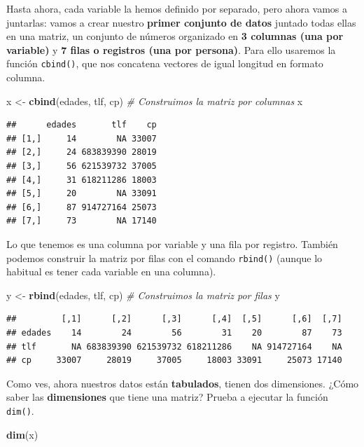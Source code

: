 \documentclass[11pt,]{book}
\newenvironment{Shaded}{\begin{snugshade}}{\end{snugshade}}
\newcommand{\CommentTok}[1]{\textcolor[rgb]{0.37,0.37,0.37}{\textit{#1}}}
\newcommand{\KeywordTok}[1]{\textcolor[rgb]{0.27,0.27,0.27}{\textbf{#1}}}
\newcommand{\NormalTok}[1]{#1}
\newcommand{\StringTok}[1]{\textcolor[rgb]{0.5,0.5,0.5}{#1}}
\begin{document}
Hasta ahora, cada variable la hemos definido por separado, pero ahora vamos a juntarlas: vamos a crear nuestro \textbf{primer conjunto de datos} juntado todas ellas en una matriz, un conjunto de números organizado en \textbf{3 columnas (una por variable)} y \textbf{7 filas o registros (una por persona)}. Para ello usaremos la función \texttt{cbind()}, que nos concatena vectores de igual longitud en formato columna.

\begin{Shaded}
\begin{Highlighting}[]
\NormalTok{x <-}\StringTok{ }\KeywordTok{cbind}\NormalTok{(edades, tlf, cp) }\CommentTok{# Construimos la matriz por columnas}
\NormalTok{x}
\end{Highlighting}
\end{Shaded}

\begin{verbatim}
##      edades       tlf    cp
## [1,]     14        NA 33007
## [2,]     24 683839390 28019
## [3,]     56 621539732 37005
## [4,]     31 618211286 18003
## [5,]     20        NA 33091
## [6,]     87 914727164 25073
## [7,]     73        NA 17140
\end{verbatim}

Lo que tenemos es una columna por variable y una fila por registro. También podemos construir la matriz por filas con el comando \texttt{rbind()} (aunque lo habitual es tener cada variable en una columna).

\begin{Shaded}
\begin{Highlighting}[]
\NormalTok{y <-}\StringTok{ }\KeywordTok{rbind}\NormalTok{(edades, tlf, cp) }\CommentTok{# Construimos la matriz por filas}
\NormalTok{y}
\end{Highlighting}
\end{Shaded}

\begin{verbatim}
##         [,1]      [,2]      [,3]      [,4]  [,5]      [,6]  [,7]
## edades    14        24        56        31    20        87    73
## tlf       NA 683839390 621539732 618211286    NA 914727164    NA
## cp     33007     28019     37005     18003 33091     25073 17140
\end{verbatim}

Como ves, ahora nuestros datos están \textbf{tabulados}, tienen dos dimensiones. ¿Cómo saber las \textbf{dimensiones} que tiene una matriz? Prueba a ejecutar la función \texttt{dim()}.

\begin{Shaded}
\begin{Highlighting}[]
\KeywordTok{dim}\NormalTok{(x)}
\end{Highlighting}
\end{Shaded}
\end{document}
